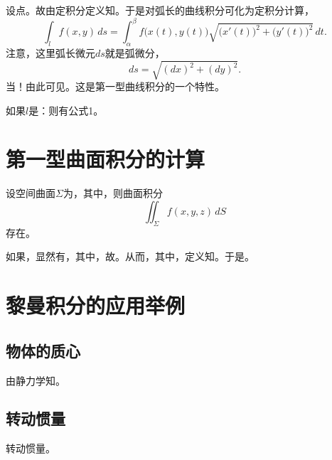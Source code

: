 设点。故由定积分定义知。于是对弧长的曲线积分可化为定积分计算，
\[
\int_l f(x,y)\,ds
=\int_{\alpha}^{\beta}f\bigl(x(t),y(t)\bigr)\sqrt{\bigl(x'(t)\bigr)^2+\bigl(y'(t)\bigr)^2}\,dt.
\]
注意，这里弧长微元$ds$就是弧微分，
\[
ds=\sqrt{(dx)^2+(dy)^2}.
\]
当！由此可见。这是第一型曲线积分的一个特性。

如果$l$是：则有公式1。

\section{第一型曲面积分的计算}

设空间曲面$\Sigma$为，其中，则曲面积分
\[
\iint_\Sigma f(x,y,z)\,dS
\]
存在。

如果，显然有，其中，故。从而，其中，定义知。于是。

\section{黎曼积分的应用举例}
\subsection{物体的质心}

由静力学知。

\subsection{转动惯量}

转动惯量。